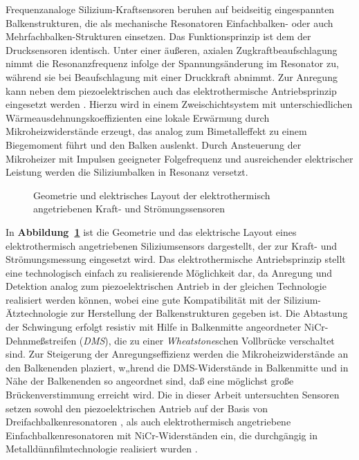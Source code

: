 Frequenzanaloge Silizium-Kraftsensoren beruhen auf beidseitig
eingespannten Balkenstrukturen, die als mechanische Resonatoren
Einfachbalken- \cite{Blo90} oder auch Mehrfachbalken-Strukturen
\cite{Wag94} einsetzen.
Das Funktionsprinzip ist dem der Drucksensoren identisch. Unter einer
äußeren, axialen Zugkraftbeaufschlagung nimmt die Resonanzfrequenz
infolge der Spannungsänderung im Resonator zu, während sie bei
Beaufschlagung mit einer Druckkraft abnimmt. Zur Anregung kann neben
dem piezoelektrischen auch das elektrothermische Antriebsprinzip
eingesetzt werden \cite{Bou90}. Hierzu wird in einem Zweischichtsystem mit
unterschiedlichen Wärmeausdehnungskoeffizienten eine lokale Erwärmung
durch Mikroheizwiderstände erzeugt, das analog zum Bimetalleffekt zu
einem Biegemoment führt und den Balken auslenkt.  Durch Ansteuerung
der Mikroheizer mit Impulsen geeigneter Folgefrequenz und ausreichender
elektrischer Leistung werden die Siliziumbalken in Resonanz versetzt.
\begin{figure}[htb]
\begin{center}

\setbalkene
\end{center}
\caption{\label{abbgmssensor}
 Geometrie und elektrisches Layout der elektrothermisch angetriebenen
 Kraft- und Strömungssensoren}
\end{figure}
In {\bf Abbildung~\ref{abbgmssensor}} ist die Geometrie und das
elektrische Layout eines elektrothermisch angetriebenen Siliziumsensors
dargestellt, der zur Kraft- und Strömungsmessung eingesetzt wird.
Das elektrothermische Antriebsprinzip stellt eine technologisch einfach zu
realisierende Möglichkeit dar, da Anregung und Detektion analog zum
piezoelektrischen Antrieb in der gleichen Technologie realisiert werden
können, wobei eine gute Kompatibilität mit der Silizium-Ätztechnologie
zur Herstellung der Balkenstrukturen gegeben ist.  Die Abtastung der
Schwingung erfolgt resistiv mit Hilfe in Balkenmitte angeordneter
NiCr-Dehnmeßstreifen ({\em DMS\/}), die zu einer {\em Wheatstone}schen
Vollbrücke verschaltet sind. Zur Steigerung der Anregungseffizienz
werden die Mikroheizwiderstände an den Balkenenden plaziert, w„hrend die
DMS-Widerstände in Balkenmitte und in Nähe der Balkenenden so
angeordnet sind, daß eine möglichst große Brückenverstimmung erreicht
wird. Die in dieser Arbeit untersuchten Sensoren setzen sowohl den
piezo\-elektrischen Antrieb auf der Basis von Dreifachbalkenresonatoren
\cite{Wag94}, als auch elektrothermisch angetriebene
Einfachbalkenresonatoren mit NiCr-Widerständen ein, die durchgängig in
Metalldünnfilmtechnologie realisiert wurden \cite{Bar93}.



